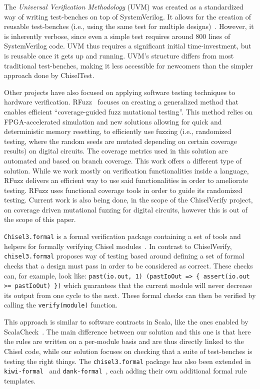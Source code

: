 \documentclass[conference]{IEEEtran}
\begin{document}
The \textit{Universal Verification Methodology} (UVM) was created as a standardized way of writing test-benches on top of SystemVerilog. 
It allows for the creation of reusable test-benches (i.e., using the same test for multiple designs)~\cite{uvm2015}. 
However, it is inherently verbose, since even a simple test requires around 800 lines of SystemVerilog code. 
UVM thus requires a significant initial time-investment, but is reusable once it gets up and running. 
UVM's structure differs from most traditional test-benches, making it less accessible for newcomers than the simpler approach done by ChiselTest.

Other projects have also focused on applying software testing techniques to hardware verification. 
RFuzz~\cite{rfuzz2018} focuses on creating a generalized method that enables efficient ``coverage-guided fuzz mutational testing''. 
This method relies on FPGA-accelerated simulation and new solutions allowing for quick and deterministic memory resetting, to efficiently use fuzzing (i.e., randomized testing, where the random seeds are mutated depending on certain coverage results) on digital circuits. 
The coverage metrics used in this solution are automated and based on branch coverage. 
This work offers a different type of solution. 
While we work mostly on verification functionalities inside a language, RFuzz delivers an efficient way to use said functionalities in order to ameliorate testing. 
RFuzz uses functional coverage tools in order to guide its randomized testing. 
Current work is also being done, in the scope of the ChiselVerify project, on coverage driven mutational fuzzing for digital circuits, however this is out of the scope of this paper.

\texttt{Chisel3.formal}  is a formal verification package containing a set of tools and helpers for formally verifying Chisel modules~\cite{chisel:formal}. 
In contrast to ChiselVerify, \texttt{chisel3.formal} proposes way of testing based around defining a set of formal checks that a design must pass in order to be considered as correct. 
These checks can, for example, look like: \texttt{past(io.out, 1) (pastIoOut => \{ assert(io.out >= pastIoOut) \})} which guarantees that the current module will never decrease its output from one cycle to the next. 
These formal checks can then be verified by calling the \texttt{verify(module)} function. 

This approach is similar to software contracts in Scala, like the ones enabled by ScalaCheck~\cite{scalacheck}. 
The main difference between our solution and this one is that here the rules are written on a per-module basis and are thus directly linked to the Chisel code, while our solution focuses on checking that a suite of test-benches is testing the right things. 
The \texttt{chisel3.formal} package has also been extended in \texttt{kiwi-formal}~\cite{chisel:kiwi-formal} and \texttt{dank-formal}~\cite{chisel:dank-formal}, each adding their own additional formal rule templates. 
\end{document}
